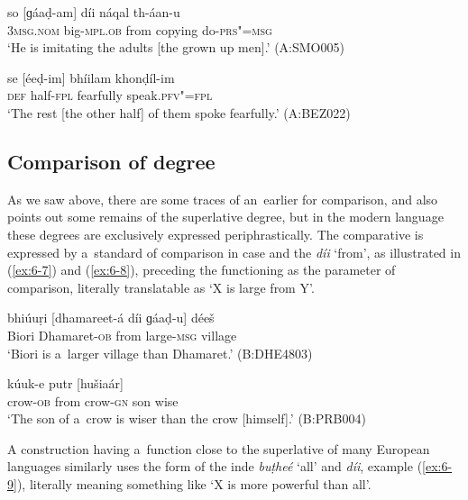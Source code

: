 {\begin{exe}
\ex
\label{ex:6-5}
\gll so [ɡáaḍ-am] díi náqal th-áan-u \\
\textsc{3msg.nom} big-\textsc{mpl.ob} from copying do-\textsc{prs"=msg} \\
\glt `He is imitating the adults [the grown up men].' (A:SMO005)

\ex
\label{ex:6-6}
\gll se [éeḍ-im] bhíilam khonḍíl-im \\
\textsc{def} half-\textsc{fpl} fearfully speak.\textsc{pfv"=fpl} \\
\glt `The rest [the other half] of them spoke fearfully.' (A:BEZ022)
\end{exe}

\subsection{Comparison of degree}
\label{subsec:6-3-3}

As we saw above, there are some traces of an~earlier  for comparison, and \citet[17]{morgenstierne1941} also points out some remains of the  superlative degree, but in the modern language these degrees are exclusively expressed periphrastically. The comparative is expressed by a~standard of comparison in  case and the  \textit{díi} `from', as illustrated in (\ref{ex:6-7}) and (\ref{ex:6-8}), preceding the  functioning as the parameter of comparison, literally translatable as `X is large from Y'. 

\begin{exe}
\ex
\label{ex:6-7}
\gll bhiúuṛi [dhamareet-á díi ɡáaḍ-u] déeš \\
Biori Dhamaret-\textsc{ob} from large-\textsc{msg} village \\
\glt `Biori is a~larger village than Dhamaret.' (B:DHE4803)

\ex
\label{ex:6-8}
 kúuk-e putr [hušiaár] \\
crow-\textsc{ob} from crow-\textsc{gn} son wise  \\
\glt `The son of a~crow is wiser than the crow [himself].' (B:PRB004)
\end{exe}

A construction having a~function close to the superlative of many European languages similarly uses the  form of the inde  \textit{buṭheé} `all' and \textit{díi}, example (\ref{ex:6-9}), literally meaning something like `X is more powerful than all'.

}
